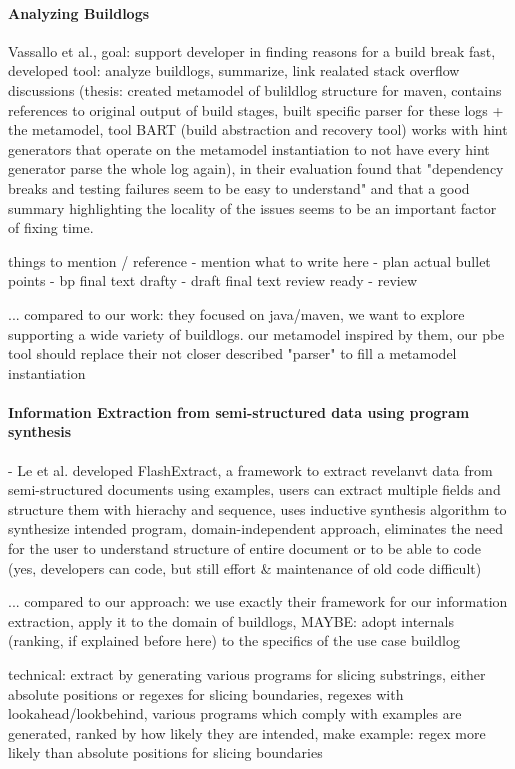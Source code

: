 \documentclass[\myrootdir/main.tex]{subfiles}
\begin{document}
\paragraph{Analyzing Buildlogs}
Vassallo et al., goal: support developer in finding reasons for a build break fast, developed tool: analyze buildlogs, summarize, link realated stack overflow discussions (thesis: created metamodel of bulildlog structure for maven, contains references to original output of build stages, built specific parser for these logs + the metamodel, tool BART (build abstraction and recovery tool) works with hint generators that operate on the metamodel instantiation to not have every hint generator parse the whole log again), in their evaluation found that "dependency breaks and testing failures seem to be easy to understand" and that a good summary highlighting the locality of the issues seems to be an important factor of fixing time. \cite{vassallo2018un-break}

things to mention / reference - mention
what to write here - plan
actual bullet points - bp
final text drafty - draft
final text review ready - review

... compared to our work: they focused on java/maven, we want to explore supporting a wide variety of buildlogs. our metamodel inspired by them, our pbe tool should replace their not closer described "parser" to fill a metamodel instantiation

\paragraph{Information Extraction from semi-structured data using program synthesis}
- Le et al. developed FlashExtract, a framework to extract revelanvt data from semi-structured documents using examples, users can extract multiple fields and structure them with hierachy and sequence, uses inductive synthesis algorithm to synthesize intended program, domain-independent approach, eliminates the need for the user to understand structure of entire document or to be able to code (yes, developers can code, but still effort \& maintenance of old code difficult)

... compared to our approach: we use exactly their framework for our information extraction, apply it to the domain of buildlogs, MAYBE: adopt internals (ranking, if explained before here) to the specifics of the use case buildlog 

technical: extract by generating various programs for slicing substrings, either absolute positions or regexes for slicing boundaries, regexes with lookahead/lookbehind, various programs which comply with examples are generated, ranked by how likely they are intended, make example: regex more likely than absolute positions for slicing boundaries
\end{document}
